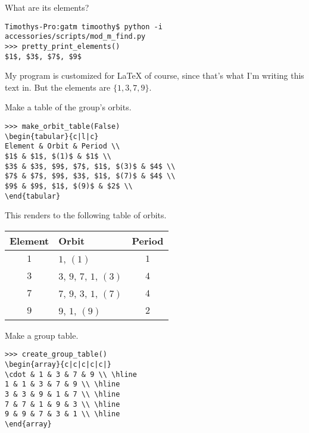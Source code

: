 \documentclass[../key.tex]{subfiles}
\begin{document}
\begin{inner_problem}[start=1]
\item What are its elements?
\end{inner_problem}

\begin{verbatim}
Timothys-Pro:gatm timoothy$ python -i accessories/scripts/mod_m_find.py
>>> pretty_print_elements()
$1$, $3$, $7$, $9$
\end{verbatim}

My program is customized for \LaTeX{} of course, since that's what I'm writing this text in. But the elements are $\{1,3,7,9\}$.

\begin{inner_problem}
\item Make a table of the group's orbits.
\end{inner_problem}

\begin{verbatim}
>>> make_orbit_table(False)
\begin{tabular}{c|l|c}
Element & Orbit & Period \\
$1$ & $1$, $(1)$ & $1$ \\
$3$ & $3$, $9$, $7$, $1$, $(3)$ & $4$ \\
$7$ & $7$, $9$, $3$, $1$, $(7)$ & $4$ \\
$9$ & $9$, $1$, $(9)$ & $2$ \\
\end{tabular}
\end{verbatim}

This renders to the following table of orbits.

\begin{tabular}{c|l|c}
Element & Orbit & Period \\ \hline
$1$ & $1$, $(1)$ & $1$ \\
$3$ & $3$, $9$, $7$, $1$, $(3)$ & $4$ \\
$7$ & $7$, $9$, $3$, $1$, $(7)$ & $4$ \\
$9$ & $9$, $1$, $(9)$ & $2$ \\
\end{tabular}

\begin{inner_problem}
\item Make a group table.
\end{inner_problem}

\begin{verbatim}
>>> create_group_table()
\begin{array}{c|c|c|c|c|}
\cdot & 1 & 3 & 7 & 9 \\ \hline
1 & 1 & 3 & 7 & 9 \\ \hline
3 & 3 & 9 & 1 & 7 \\ \hline
7 & 7 & 1 & 9 & 3 \\ \hline
9 & 9 & 7 & 3 & 1 \\ \hline
\end{array}
\end{verbatim}
\end{document}
